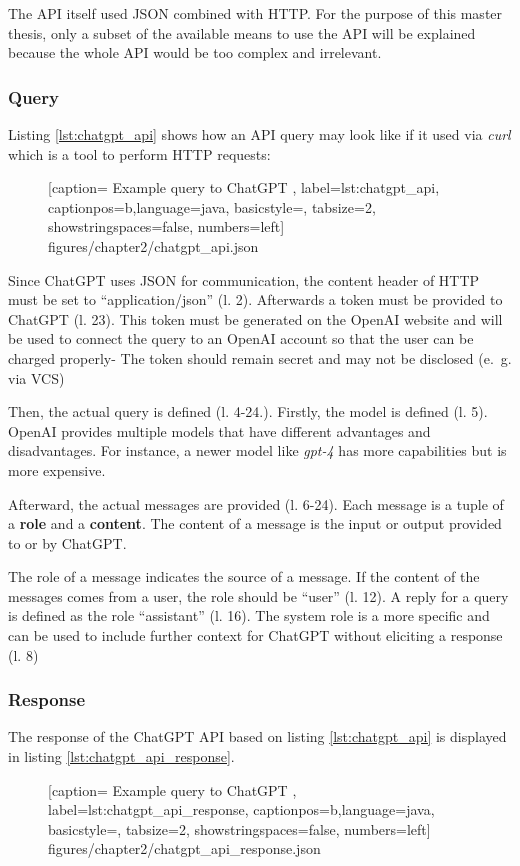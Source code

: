 The \ac{API} itself used JSON combined with \ac{HTTP}. For the purpose of this master thesis, only a subset of the available means to use the \ac{API} will be explained because the whole \ac{API} would be too complex and irrelevant. 

\subsubsection{Query}
Listing \ref{lst:chatgpt_api} shows how an \ac{API} query may look like if it used via \textit{curl} which is a tool to  perform \ac{HTTP} requests:
 \begin{figure} [htbp!]
			
			[caption={ Example query to ChatGPT  \cite{ChatGPT_url}},
			label={lst:chatgpt_api},
			captionpos=b,language=java, basicstyle=\footnotesize, tabsize=2, showstringspaces=false,  numbers=left]
			{figures/chapter2/chatgpt_api.json}
		\end{figure}
 

Since ChatGPT uses \ac{JSON} for communication, the content header of \ac{HTTP}  must be set to \enquote{application/json} (l. 2). Afterwards a token must be provided to ChatGPT (l. 23). This  token must be generated on the OpenAI website and will be used to connect the query to an OpenAI account so that the user can be charged properly- The token should remain secret and may not be disclosed (e.~g. via \ac{VCS}) 

Then, the actual query is defined (l. 4-24.). Firstly, the model is defined (l. 5). OpenAI provides multiple models that have different advantages and disadvantages. For instance, a newer model like \textit{gpt-4} has more capabilities but is more expensive. 

Afterward, the actual messages are provided (l. 6-24). Each message is a tuple of a \textbf{role} and a \textbf{content}. The content of a message is the input or output provided to or by ChatGPT. 

The role of a message indicates the source of a message. If the content of the messages comes from a user, the role should be \enquote{user} (l. 12). A reply for a query is defined as the role \enquote{assistant} (l. 16). The system role is a more specific and can be used to include further context for ChatGPT without eliciting a response (l. 8)
\subsubsection{Response}

The response of the ChatGPT \ac{API} based on listing \ref{lst:chatgpt_api} is displayed in listing \ref{lst:chatgpt_api_response}.
 \begin{figure} [htbp!]
			
			[caption={ Example query to ChatGPT  \cite{ChatGPT_url}},
			label={lst:chatgpt_api_response},
			captionpos=b,language=java, basicstyle=\footnotesize, tabsize=2, showstringspaces=false,  numbers=left]
			{figures/chapter2/chatgpt_api_response.json}
		\end{figure}

